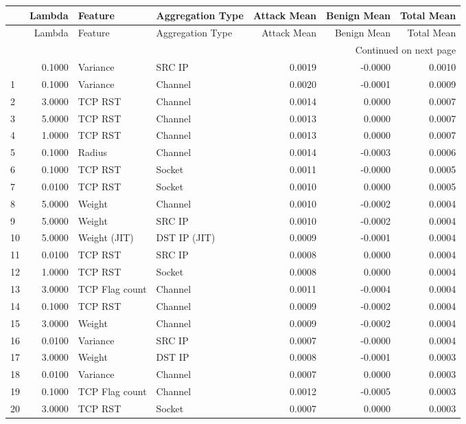 \begin{longtable}{lrllrrr}
\toprule
 & Lambda & Feature & Aggregation Type & Attack Mean & Benign Mean & Total Mean \\
\midrule
\endfirsthead
\toprule
 & Lambda & Feature & Aggregation Type & Attack Mean & Benign Mean & Total Mean \\
\midrule
\endhead
\midrule
\multicolumn{7}{r}{Continued on next page} \\
\midrule
\endfoot
\bottomrule
\endlastfoot
0 & 0.1000 & Variance & SRC IP & 0.0019 & -0.0000 & 0.0010 \\
1 & 0.1000 & Variance & Channel & 0.0020 & -0.0001 & 0.0009 \\
2 & 3.0000 & TCP RST & Channel & 0.0014 & 0.0000 & 0.0007 \\
3 & 5.0000 & TCP RST & Channel & 0.0013 & 0.0000 & 0.0007 \\
4 & 1.0000 & TCP RST & Channel & 0.0013 & 0.0000 & 0.0007 \\
5 & 0.1000 & Radius & Channel & 0.0014 & -0.0003 & 0.0006 \\
6 & 0.1000 & TCP RST & Socket & 0.0011 & -0.0000 & 0.0005 \\
7 & 0.0100 & TCP RST & Socket & 0.0010 & 0.0000 & 0.0005 \\
8 & 5.0000 & Weight & Channel & 0.0010 & -0.0002 & 0.0004 \\
9 & 5.0000 & Weight & SRC IP & 0.0010 & -0.0002 & 0.0004 \\
10 & 5.0000 & Weight (JIT) & DST IP (JIT) & 0.0009 & -0.0001 & 0.0004 \\
11 & 0.0100 & TCP RST & SRC IP & 0.0008 & 0.0000 & 0.0004 \\
12 & 1.0000 & TCP RST & Socket & 0.0008 & 0.0000 & 0.0004 \\
13 & 3.0000 & TCP Flag count & Channel & 0.0011 & -0.0004 & 0.0004 \\
14 & 0.1000 & TCP RST & Channel & 0.0009 & -0.0002 & 0.0004 \\
15 & 3.0000 & Weight & Channel & 0.0009 & -0.0002 & 0.0004 \\
16 & 0.0100 & Variance & SRC IP & 0.0007 & -0.0000 & 0.0004 \\
17 & 3.0000 & Weight & DST IP & 0.0008 & -0.0001 & 0.0003 \\
18 & 0.0100 & Variance & Channel & 0.0007 & 0.0000 & 0.0003 \\
19 & 0.1000 & TCP Flag count & Channel & 0.0012 & -0.0005 & 0.0003 \\
20 & 3.0000 & TCP RST & Socket & 0.0007 & 0.0000 & 0.0003 \\

\end{longtable}
